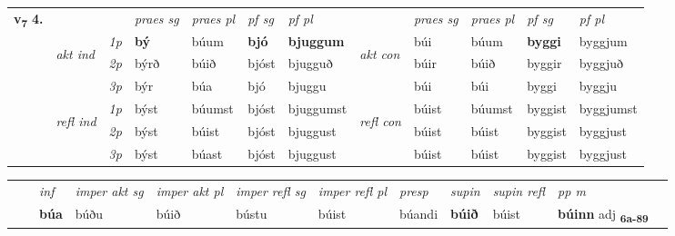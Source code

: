 \begin{tabular}{llllllllllll} \toprule
\multirow{4}{*}{{{\textbf{v{\textsubscript{7}}} \Large{\textbf{4.}}}}}  & &   &  \textit{praes sg}  & \textit{praes pl}  &\textit{ pf sg} & \textit{pf pl} &  &  \textit{praes sg}  & \textit{praes pl}  & \textit{pf sg} & \textit{pf pl } \\*
	\cmidrule{4-7} \cmidrule{9-12}
 & \multirow{3}{*}{\begin{turn}{90}\textit{akt ind}\end{turn}} & {\textit{1p}} & \textbf{bý} & búum    & \textbf{bjó} & \textbf{bjuggum} & \multirow{3}{*}{\begin{turn}{90}\textit{akt con}\end{turn}} &búi & búum & \textbf{byggi} & byggjum\\*
& &  {\textit{2p}} &  býrð  & búið   & bjóst & bjugguð & & búir & búið & byggir & byggjuð \\*
& &  {\textit{3p}} & býr & búa   & bjó & bjuggu & & búi & búi& byggi & byggju  \\*
\cmidrule{4-7} \cmidrule{9-12}
 &\multirow{3}{*}{\begin{turn}{90}\textit{refl ind}\end{turn}} & {\textit{1p}} & býst & búumst    & bjóst & bjuggumst & \multirow{3}{*}{\begin{turn}{90}\textit{refl con}\end{turn}}  &búist & búumst & byggist & byggjumst\\*
 &&  {\textit{2p}} &  býst  & búist   & bjóst & bjuggust & &búist & búist & byggist & byggjust \\*
& &  {\textit{3p}} & býst & búast   & bjóst & bjuggust & & búist & búist& byggist & byggjust  \\*
\cmidrule{4-7} \cmidrule{9-12}
\end{tabular}


\begin{tabular}{llllllllllll}
 & & \textit{inf} & \textit{imper akt sg} & \textit{imper akt pl} & \textit{imper refl sg} & \textit{imper refl pl} & \textit{presp} & \textit{supin} & \textit{supin refl} & \textit{pp m}     \\*
  & & \textbf{búa} & búðu  & búið & bústu & búist & búandi &  \textbf{búið} & búist & \textbf{búinn} adj \textbf{\textsubscript{6a-89}} \\*
\cmidrule{1-12}
\end{tabular}



